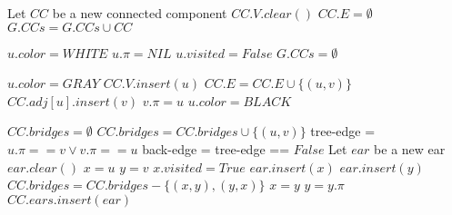 \documentclass{book}
\begin{document}
	\begin{algorithm*}[h!]
		\begin{algorithmic}[1]
				\State {} 
					 
						\State Let $CC$ be a new connected component 
						\State $CC.V.clear()$
						\State $CC.E = \emptyset$
						\State {} 
						\State {} 
						\State $G.CCs = G.CCs \cup CC$
					\EndIf
				\EndFor
			\EndFunction
		\end{algorithmic}
	\end{algorithm*}
	\FloatBarrier
	\begin{algorithm*}[h!]
		\begin{algorithmic}[1]		
					\State $u.color = WHITE$
					\State $u.\pi = NIL$
					\State $u.visited = False$ 
				\EndFor
				\State $G.CCs = \emptyset$ 		
			\EndFunction
		\end{algorithmic}
	\end{algorithm*}	
	\FloatBarrier
	\begin{algorithm*}[h!]
		\begin{algorithmic}[1]
				\State $u.color = GRAY$
				\State $CC.V.insert(u)$ 
					\State $CC.E = CC.E \cup \{(u, v)\}$
					\State $CC.adj[u].insert(v)$
						
						\State $v.\pi = u$
						\State {}
					\EndIf
				\EndFor
				\State $u.color = BLACK$
			\EndFunction
		\end{algorithmic}
	\end{algorithm*}
	\FloatBarrier
	\begin{algorithm*}[h!]
		\begin{algorithmic}[1]
				\State $CC.bridges = \emptyset$
					\State $CC.bridges = CC.bridges \cup \{(u, v)\}$
				\EndFor
				 
						\State tree-edge = $u.\pi == v \lor v.\pi == u$
						\State back-edge = tree-edge == $False$
							\State Let $ear$ be a new ear
							\State $ear.clear()$
							\State $x = u$
							\State $y = v$
							\Repeat
								\State $x.visited = True$
								\State $ear.insert(x)$
								\State $ear.insert(y)$
								\State $CC.bridges = CC.bridges - \{(x, y), (y, x)\}$
								\State $x = y$
								\State $y = y.\pi$					
							\State $CC.ears.insert(ear)$
						\EndIf
					\EndFor
				\EndFor
			\EndFunction
		\end{algorithmic}
	\end{algorithm*}
\end{document}

